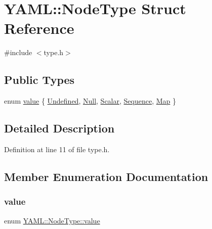 \hypertarget{struct_y_a_m_l_1_1_node_type}{}\section{Y\+A\+ML\+::Node\+Type Struct Reference}
\label{struct_y_a_m_l_1_1_node_type}


{\ttfamily \#include $<$type.\+h$>$}

\subsection*{Public Types}
\begin{DoxyCompactItemize}
\item 
enum \mbox{\hyperlink{struct_y_a_m_l_1_1_node_type_af83cf3f3c2eca0bf0eae1bbf981e86c4}{value}} \{ \newline
\mbox{\hyperlink{struct_y_a_m_l_1_1_node_type_af83cf3f3c2eca0bf0eae1bbf981e86c4aeb0d86b144df4896751615d3ec6665a9}{Undefined}}, 
\mbox{\hyperlink{struct_y_a_m_l_1_1_node_type_af83cf3f3c2eca0bf0eae1bbf981e86c4a41a3999c88dafc01670232938fa117a6}{Null}}, 
\mbox{\hyperlink{struct_y_a_m_l_1_1_node_type_af83cf3f3c2eca0bf0eae1bbf981e86c4a0c01179d94bd3d4c7776384016b89c1f}{Scalar}}, 
\mbox{\hyperlink{struct_y_a_m_l_1_1_node_type_af83cf3f3c2eca0bf0eae1bbf981e86c4ae197fc9c4aad8fe2f58aa35fa908ed5a}{Sequence}}, 
\newline
\mbox{\hyperlink{struct_y_a_m_l_1_1_node_type_af83cf3f3c2eca0bf0eae1bbf981e86c4a68e9b8832f166b7490663a46042053b6}{Map}}
 \}
\end{DoxyCompactItemize}


\subsection{Detailed Description}


Definition at line 11 of file type.\+h.



\subsection{Member Enumeration Documentation}
\mbox{\label{struct_y_a_m_l_1_1_node_type_af83cf3f3c2eca0bf0eae1bbf981e86c4}} 
\subsubsection{\texorpdfstring{value}{value}}
{\footnotesize\ttfamily enum \mbox{\hyperlink{struct_y_a_m_l_1_1_node_type_af83cf3f3c2eca0bf0eae1bbf981e86c4}{Y\+A\+M\+L\+::\+Node\+Type\+::value}}}

